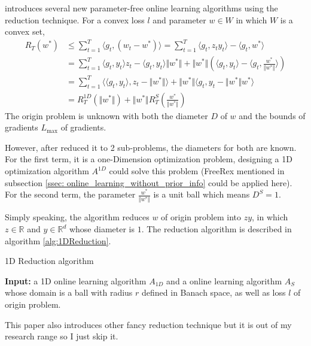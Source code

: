 \cite{Cutkosky2018} introduces several new parameter-free online learning algorithms using the reduction technique. For a convex loss $l$ and parameter $w \in W$ in which $W$ is a convex set, 
\begin{equation}\label{eq:reduction}
\begin{aligned}
    R_T(w^{*}) & \leq \sum_{t=1}^{T} \langle g_t, (w_t-w^{*}) \rangle = \sum_{t=1}^{T} \langle g_t, z_ty_t \rangle - \langle g_t, w^{*} \rangle \\
               & = \sum_{t=1}^{T} \langle g_t, y_t \rangle z_t - \langle g_t, y_t \rangle {\Vert{w^{*}}\Vert} + {\Vert{w^{*}}\Vert} (\langle g_t, y_t \rangle  - \langle g_t,  \frac{w^{*}} {\Vert{w^{*}}\Vert}\rangle)\\
               & = \sum_{t=1}^{T} \langle \langle g_t, y_t \rangle , z_t-{\Vert{w^{*}}\Vert}\rangle + {\Vert {w^{*}}\Vert} \langle g_t, y_t-{\Vert{w^{*}}\Vert}w^{*}\rangle \\
               & = R_T^{1D}({\Vert {w^{*}}\Vert}) + {\Vert{w^{*}}\Vert} R_T^S( \frac{w^{*}}{\Vert{w^{*}}\Vert})
\end{aligned}
\end{equation}
The origin problem is unknown with both the diameter $D$ of $w$ and the bounds of gradients $L_{\max}$ of gradients. 

However, after reduced it to 2 sub-problems, the diameters for both are known.
For the first term, it is a one-Dimension optimization problem, designing a 1D optimization algorithm $A^{1D}$ could solve this problem (FreeRex mentioned in subsection \ref{ssec: online_learning_without_prior_info} could be applied here). For the second term, the parameter $\frac {w^{*}}{\Vert w^{*} \Vert}$ is a unit ball which means $D^{S} = 1$. 

Simply speaking, the algorithm reduces $w$ of origin problem into $zy$, in which $z \in \mathbb{R}$ and $y \in {\mathbb{R}}^d$ whose diameter is $1$. The reduction algorithm is described in algorithm \ref{alg:1DReduction}. 
\begin{algorithm}
\caption{1D Reduction algorithm}
\label{alg:1DReduction}
{\bfseries Input:} a 1D online learning algorithm $A_{1D}$ and a online learning algorithm $A_S$ whose domain is a ball with radius $r$ defined in Banach space, as well as loss $l$ of origin problem.
\begin{algorithmic}[1]
\EndFor
\end{algorithmic}
\end{algorithm}

This paper also introduces other fancy reduction technique but it is out of my research range so I just skip it.
